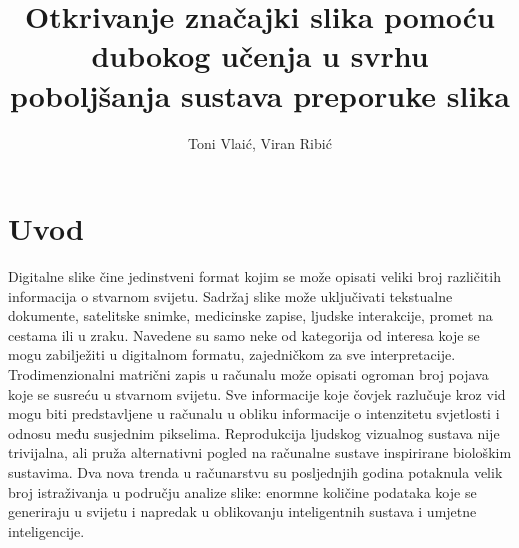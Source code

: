 \documentclass[times, utf8, proizvoljni, numeric]{fer}
\begin{document}
\author{Toni Vlaić, Viran Ribić}
\title{Otkrivanje značajki slika pomoću dubokog učenja u svrhu poboljšanja sustava preporuke slika}

\maketitle

\thispagestyle{empty}

\tableofcontents
\thispagestyle{empty}
\listoftables
\thispagestyle{empty}
\listoffigures
\thispagestyle{empty}


\chapter{Uvod}


Digitalne slike čine jedinstveni format kojim se može opisati veliki broj različitih informacija o stvarnom svijetu. Sadržaj slike može uključivati tekstualne dokumente, satelitske snimke, medicinske zapise, ljudske interakcije, promet na cestama ili u zraku. Navedene su samo neke od kategorija od interesa koje se mogu zabilježiti u digitalnom formatu, zajedničkom za sve interpretacije. Trodimenzionalni matrični zapis u računalu može opisati ogroman broj pojava koje se susreću u stvarnom svijetu. Sve informacije koje čovjek razlučuje kroz vid mogu biti predstavljene u računalu u obliku informacije o intenzitetu svjetlosti i odnosu među susjednim pikselima. Reprodukcija ljudskog vizualnog sustava nije trivijalna, ali pruža alternativni pogled na računalne sustave inspirirane biološkim sustavima. Dva nova trenda u računarstvu su posljednjih godina potaknula velik broj istraživanja u području analize slike: enormne količine podataka koje se generiraju u svijetu i napredak u oblikovanju inteligentnih sustava i umjetne inteligencije. 
\end{document}
